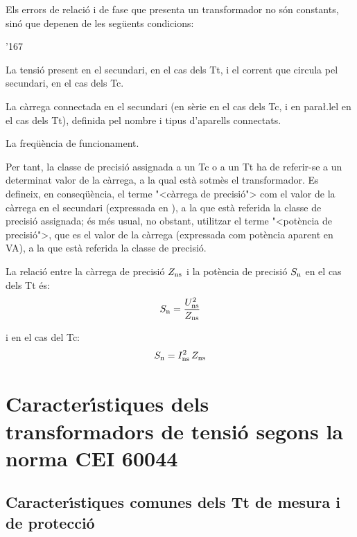 Els errors de relaci\'{o} i de fase que presenta un transformador no s\'{o}n
constants, sin\'{o} que depenen de les seg\"{u}ents condicions:
\begin{dinglist}{'167}
   \item La tensi\'{o} present en el secundari, en el cas dels Tt, i el corrent que
   circula    pel secundari, en el cas dels Tc.
   \item La c\`{a}rrega connectada en el secundari (en s\`{e}rie en el cas dels Tc,
   i en para{\l.l}el en el cas dels Tt), definida pel nombre i tipus d'aparells connectats.
   \item La freq\"{u}\`{e}ncia de funcionament.
\end{dinglist}

Per tant, la classe de precisi\'{o} assignada a un Tc o a un Tt ha de
referir-se a un determinat valor de la c\`{a}rrega, a la qual est\`{a}
sotm\`{e}s el transformador. Es defineix, en conseq\"{u}\`{e}ncia, el terme
{"<}c\`{a}rrega de precisi\'{o}{">} com el valor de la c\`{a}rrega en el secundari
(expressada en \ohm), a la que est\`{a} referida la classe de precisi\'{o}
assignada; \'{e}s m\'{e}s usual, no obstant,  utilitzar el terme {"<}pot\`{e}ncia
de precisi\'{o}{">}, que es el valor de la c\`{a}rrega (expressada com pot\`{e}ncia
aparent en VA),
 a la que est\`{a} referida la classe de precisi\'{o}.

La relaci\'{o} entre la c\`{a}rrega de precisi\'{o} $Z_\mathrm{ns}$ i la pot\`{e}ncia de
precisi\'{o} $S_\mathrm{n}$ en el cas dels Tt \'{e}s:
\begin{equation}
    S_\mathrm{n} = \frac{U_\mathrm{ns}^2}{Z_\mathrm{ns}}
\end{equation}

i en el cas del Tc:
\begin{equation}\label{eq:sn_ti}
    S_\mathrm{n} = I_\mathrm{ns}^2 \,Z_\mathrm{ns}
\end{equation}


\section{Caracter\'{\i}stiques dels transformadors de tensi\'{o} segons la norma \textsf{CEI 60044}}

\subsection{Caracter\'{\i}stiques comunes dels Tt de mesura i de protecci\'{o}}

